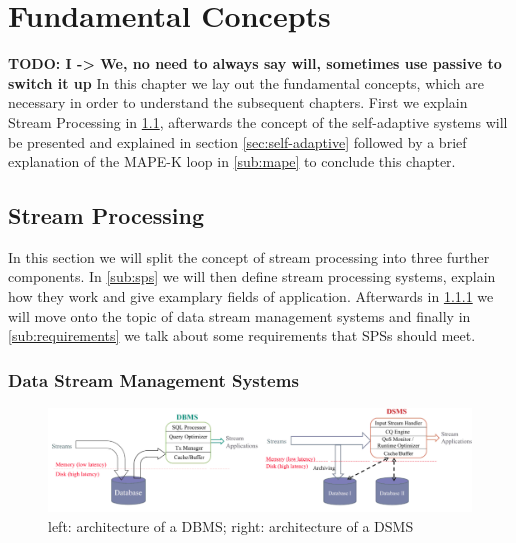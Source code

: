 
\chapter{Fundamental Concepts}
\label{cha:fundamentals}
\textbf{TODO: I -> We, no need to always say will, sometimes use passive to switch it up}
In this chapter we lay out the fundamental concepts, which are necessary in order to understand the subsequent chapters.
First we explain Stream Processing in \ref{sec:stream-processing}, afterwards the concept of the self-adaptive systems will be presented and explained in section \ref{sec:self-adaptive} 
followed by a brief explanation of the MAPE-K loop in \ref{sub:mape} to conclude this chapter.

    \section{Stream Processing}
    \label{sec:stream-processing}
    In this section we will split the concept of stream processing into three further components.
    In \ref{sub:sps} we will then define stream processing systems, explain how they work and give examplary fields of application.
    Afterwards in \ref{sub:dsms} we will move onto the topic of data stream management systems and finally in \ref{sub:requirements} we talk about
    some requirements that SPSs should meet.
    
        \subsection{Data Stream Management Systems}
        \label{sub:dsms}

        \begin{figure}[h]
            \label{fig:dbms_dsms}
            \centering
            \includegraphics[width=1.0\textwidth]{Bilder/dbms_dsms.png}
            \caption{
                   left: architecture of a DBMS; right: architecture of a DSMS
                   }
        \end{figure}

